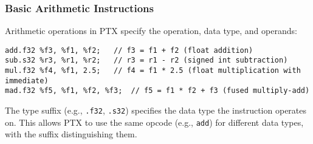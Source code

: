 \subsubsection{Basic Arithmetic Instructions}

Arithmetic operations in PTX specify the operation, data type, and operands:

\begin{lstlisting}[style=ptx]
add.f32 %f3, %f1, %f2;   // f3 = f1 + f2 (float addition)
sub.s32 %r3, %r1, %r2;   // r3 = r1 - r2 (signed int subtraction)
mul.f32 %f4, %f1, 2.5;   // f4 = f1 * 2.5 (float multiplication with immediate)
mad.f32 %f5, %f1, %f2, %f3;  // f5 = f1 * f2 + f3 (fused multiply-add)
\end{lstlisting}

The type suffix (e.g., \texttt{.f32}, \texttt{.s32}) specifies the data type the instruction operates on. This allows PTX to use the same opcode (e.g., \texttt{add}) for different data types, with the suffix distinguishing them.

